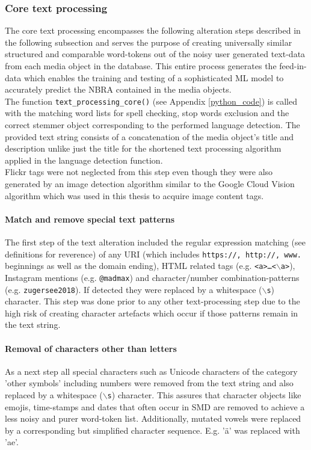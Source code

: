 \subsubsection{Core text processing} \label{core_text_processing}
The core text processing encompasses the following alteration steps described in the following subsection and serves the purpose of creating universally similar structured and comparable word-tokens out of the noisy user generated text-data from each media object in the database. This entire process generates the feed-in-data which enables the training and testing of a sophisticated ML model to accurately predict the NBRA contained in the media objects.\\
The function \texttt{text\_processing\_core()} (see Appendix \ref{python_code}) is called with the matching word lists for spell checking, stop words exclusion and the correct stemmer object corresponding to the performed language detection. The provided text string consists of a concatenation of the media object's title and description unlike just the title for the shortened text processing algorithm applied in the language detection function.\\
Flickr tags were not neglected from this step even though they were also generated by an image detection algorithm similar to the Google Cloud Vision algorithm which was used in this thesis to acquire image content tags.

\paragraph*{Match and remove special text patterns} \label{text_patterns}
The first step of the text alteration included the regular expression matching (see definitions for reverence) of any URI (which includes \texttt{https://, http://, www.} beginnings as well as the domain ending), HTML related tags (e.g. \texttt{<a>\dots<$\backslash$a>}), Instagram mentions (e.g. \texttt{@madmax}) and character/number combination-patterns (e.g. \texttt{zugersee2018}). If detected they were replaced by a whitespace (\texttt{$\backslash$s}) character. This step was done prior to any other text-processing step due to the high risk of creating character artefacts which occur if those patterns remain in the text string.

\paragraph*{Removal of characters other than letters} \label{remove_eveything_but_letters}
As a next step all special characters such as Unicode characters of the category 'other symbols' including numbers were removed from the text string and also replaced by a whitespace (\texttt{$\backslash$s}) character. This assures that character objects like emojis, time-stamps and dates that often occur in SMD are removed to achieve a less noisy and purer word-token list. Additionally, mutated vowels were replaced by a corresponding but simplified character sequence. E.g. '\"a' was replaced with 'ae'.

